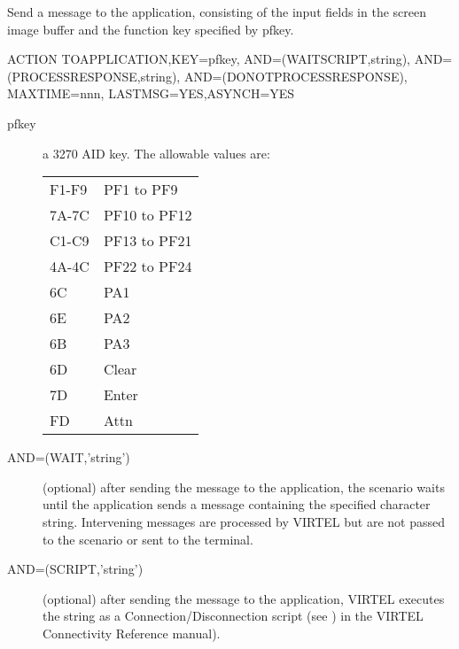 \documentclass[letterpaper,10pt,english]{sphinxmanual}
\begin{document}
Send a message to the application, consisting of the input fields in the screen image buffer and the function key
specified by pfkey.

\begin{sphinxVerbatim}[commandchars=\\\{\}]
ACTION\PYGZdl{} TO\PYGZhy{}APPLICATION,KEY=pfkey,
AND=(WAIT\textbar{}SCRIPT,\PYGZsq{}string\PYGZsq{}),
AND=(PROCESS\PYGZhy{}RESPONSE,\PYGZsq{}string\PYGZsq{}),
AND=(DO\PYGZhy{}NOT\PYGZhy{}PROCESS\PYGZhy{}RESPONSE),
MAXTIME=nnn,
LASTMSG=YES,ASYNCH=YES
\end{sphinxVerbatim}
\begin{description}
\item[{pfkey}] \leavevmode
a 3270 AID key. The allowable values are:


\begin{savenotes}\sphinxattablestart
\centering
\begin{tabulary}{\linewidth}[t]{|T|T|}
\hline
{}\relax &\relax \\
\hline
F1-F9
&
PF1 to PF9
\\
\hline
7A-7C
&
PF10 to PF12
\\
\hline
C1-C9
&
PF13 to PF21
\\
\hline
4A-4C
&
PF22 to PF24
\\
\hline
6C
&
PA1
\\
\hline
6E
&
PA2
\\
\hline
6B
&
PA3
\\
\hline
6D
&
Clear
\\
\hline
7D
&
Enter
\\
\hline
FD
&
Attn
\\
\hline
\end{tabulary}
\par
\sphinxattableend\end{savenotes}

\item[{AND=(WAIT,’string’)}] \leavevmode
(optional) after sending the message to the application, the scenario waits until the application sends a message containing the specified character string. Intervening messages are processed by VIRTEL but are not passed to the scenario or sent to the terminal.

\item[{AND=(SCRIPT,’string’)}] \leavevmode
(optional) after sending the message to the application, VIRTEL executes the string as a Connection/Disconnection script (see )  in the VIRTEL Connectivity Reference manual).


\end{description}
\end{document}
